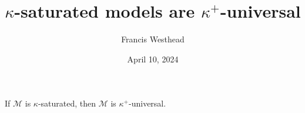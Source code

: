 \documentclass[a4paper]{article}
\title{\(\kappa\)-saturated models are \(\kappa ^+\)-universal}
\date{April 10, 2024}
\author{Francis Westhead}
\begin{document}
\maketitle
\par{If \(\mathcal {M}\) is \(\kappa\)-saturated, then \(\mathcal {M}\) is \(\kappa ^+\)-universal.}
\printbibliography
\end{document}
